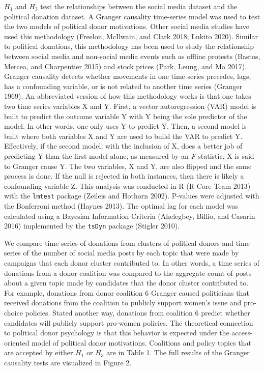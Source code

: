 \documentclass[12pt,]{article}
\begin{document}
\(H_{1}\) and \(H_{3}\) test the relationships between the social media
dataset and the political donation dataset. A Granger causality
time-series model was used to test the two models of political donor
motivations. Other social media studies have used this methodology
(Freelon, McIlwain, and Clark 2018; Lukito 2020). Similar to political
donations, this methodology has been used to study the relationship
between social media and non-social media events such as offline
protests (Bastos, Mercea, and Charpentier 2015) and stock prices (Park,
Leung, and Ma 2017). Granger causality detects whether movements in one
time series precedes, lags, has a confounding variable, or is not
related to another time series (Granger 1969). An abbreviated version of
how this methodology works is that one takes two time series variables X
and Y. First, a vector autoregression (VAR) model is built to predict
the outcome variable Y with Y being the sole predictor of the model. In
other words, one only uses Y to predict Y. Then, a second model is built
where both variables X and Y are used to build the VAR to predict Y.
Effectively, if the second model, with the inclusion of X, does a better
job of predicting Y than the first model alone, as measured by an
\emph{F}-statistic, X is said to Granger cause Y. The two variables, X
and Y, are also flipped and the same process is done. If the null is
rejected in both instances, then there is likely a confounding variable
Z. This analysis was conducted in R (R Core Team 2013) with the
\texttt{lmtest} package (Zeileis and Hothorn 2002). P-values were
adjusted with the Bonferroni method (Haynes 2013). The optimal lag for
each model was calculated using a Bayesian Information Criteria
(Ahelegbey, Billio, and Casarin 2016) implemented by the \texttt{tsDyn}
package (Stigler 2010).

We compare time series of donations from clusters of political donors
and time series of the number of social media posts by each topic that
were made by campaigns that each donor cluster contributed to. In other
words, a time series of donations from a donor coalition was compared to
the aggregate count of posts about a given topic made by candidates that
the donor cluster contributed to. For example, donations from donor
coalition 6 Granger caused politicians that received donations from the
coalition to publicly support women's issue and pro-choice policies.
Stated another way, donations from coalition 6 predict whether
candidates will publicly support pro-women policies. The theoretical
connection to political donor psychology is that this behavior is
expected under the access-oriented model of political donor motivations.
Coalitions and policy topics that are accepted by either \(H_{1}\) or
\(H_{3}\) are in Table 1. The full results of the Granger causality
tests are visualized in Figure 2.
\end{document}
